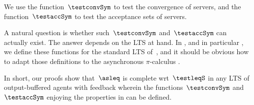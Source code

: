 We use the function~$\testconvSym$ to test the convergence of servers, and the
function~$\testaccSym$ to test the acceptance sets of servers.

A natural question is whether such~$\testconvSym$ and~$\testaccSym$ can actually exist.
The answer depends on the LTS at hand. In ,
and in particular , we define these functions for
the standard LTS of~\ACCS, and it should be obvious how to adapt those
definitions to the asynchronous $\pi$-calculus \cite{DBLP:journals/jlp/Hennessy05}.

In short, our proofs show that~$\asleq$ is complete wrt~$\testleqS$
in any LTS of output-buffered agents with feedback wherein the
functions~$\testconvSym$ and~$\testaccSym$ enjoying the properties in
 can be defined.











